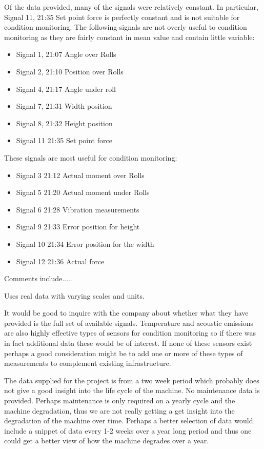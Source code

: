 \documentclass[]{article}
\begin{document}
Of the data provided, many of the signals were relatively constant. In particular, Signal 11, 21:35 Set point force is perfectly constant and is not suitable for condition monitoring. The following signals are not overly useful to condition monitoring as they are fairly constant in mean value and contain little variable: 
\begin{itemize}
\item Signal 1, 21:07 Angle over Rolls
\item Signal 2, 21:10 Position over Rolls
\item Signal 4, 21:17 Angle under roll
\item Signal 7, 21:31 Width position
\item Signal 8, 21:32 Height position
\item Signal 11 21:35 Set point force
\end{itemize}

These signals are most useful for condition monitoring:
\begin{itemize}
\item Signal 3 21:12 Actual moment over Rolls
\item Signal 5 21:20 Actual moment under Rolls
\item Signal 6 21:28 Vibration measurements 
\item Signal 9 21:33 Error position for height
\item Signal 10 21:34 Error position for the width
\item Signal 12 21:36 Actual force           
\end{itemize}



Comments include.....

Uses real data with varying scales and units.

It would be good to inquire with the company about whether what they have provided is the full set of available signals. Temperature and acoustic emissions are also highly effective types of sensors for condition monitoring so if there was in fact additional data these would be of interest. If none of these sensors exist perhaps a good consideration might be to add one or more of these types of measurements to complement existing infrastructure.

The data supplied for the project is from a two week period which probably does not give a good insight into the life cycle of the machine. No maintenance data is provided. Perhaps maintenance is only required on a yearly cycle and the machine degradation, thus we are not really getting a get insight into the degradation of the machine over time. Perhaps a better selection of data would include a snippet of data every 1-2 weeks over a year long period and thus one could get a better view of how the machine degrades over a year.
\end{document}
